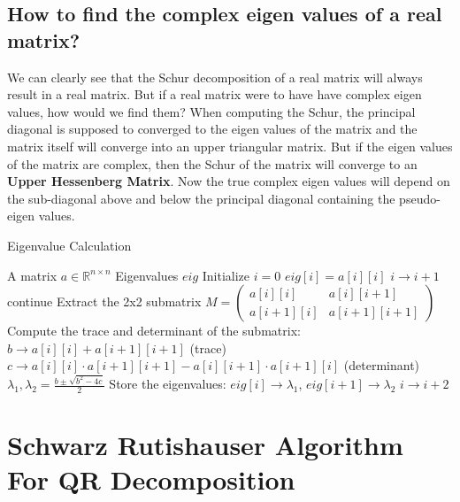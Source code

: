 \documentclass[12pt]{article}
\begin{document}
	\subsection{How to find the complex eigen values of a real matrix?}
	We can clearly see that the Schur decomposition of a real matrix will always result in a real matrix. But if a real matrix were to have have complex eigen values, how would we find them? When computing the Schur, the principal diagonal is supposed to converged to the eigen values of the matrix and the matrix itself will converge into an upper triangular matrix. But if the eigen values of the matrix are complex, then the Schur of the matrix will converge to an \textbf{Upper Hessenberg Matrix}. Now the true complex eigen values will depend on the sub-diagonal above and below the principal diagonal containing the pseudo-eigen values.  
	\begin{algorithm}
		\caption{Eigenvalue Calculation}
		\label{eig}
		\begin{algorithmic}[1]
			\Require A matrix \( a \in \mathbb{R}^{n \times n} \)
			\Ensure Eigenvalues \( eig \)
			\State Initialize \( i = 0 \)
			\State $eig[i]  = a[i][i]$
			\State $i \rightarrow i + 1$
			\State continue
			\Else
			\State Extract the 2x2 submatrix \( M = \begin{pmatrix} a[i][i] & a[i][i+1] \\ a[i+1][i] & a[i+1][i+1] \end{pmatrix} \)
			\State Compute the trace and determinant of the submatrix:
			\State \( b \rightarrow a[i][i] + a[i+1][i+1] \) \quad (trace)
			\State \( c \rightarrow a[i][i] \cdot a[i+1][i+1] - a[i][i+1] \cdot a[i+1][i] \) \quad (determinant)
			\State \( \lambda_1, \lambda_2 = \frac{b \pm \sqrt{b^2 - 4c}}{2} \)
			\State Store the eigenvalues: \( eig[i] \rightarrow \lambda_1 \), \( eig[i+1] \rightarrow \lambda_2 \)
			\State \( i \rightarrow i + 2 \)
			\EndIf
			\EndWhile
		\end{algorithmic}
	\end{algorithm}
	\newpage
	\section{Schwarz Rutishauser Algorithm For QR Decomposition \cite{7}}
\end{document}
